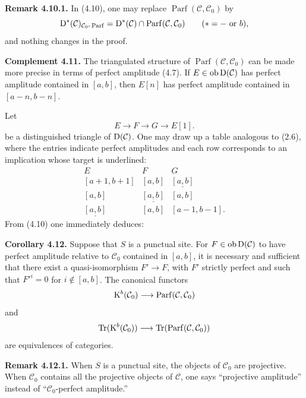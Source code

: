 \documentclass[11pt]{article}
\newcommand{\Parf}{\operatorname{Parf}}
\begin{document}
\textbf{Remark 4.10.1.} In (4.10), one may replace \(\Parf(\mathcal C,\mathcal C_0)\) by
\[
  \Dpx^*(\mathcal C)_{\mathcal C_0\text{-}\Parf}
  =\Dpx^*(\mathcal C)\cap\Parf(\mathcal C,\mathcal C_0)
  \qquad(*=-\text{ or }b),
\]
and nothing changes in the proof.

\textbf{Complement 4.11.} The triangulated structure of \(\Parf(\mathcal C,\mathcal C_0)\) can be made more precise in terms of perfect amplitude (4.7). If \(E\in\Ob\Dpx(\mathcal C)\) has perfect amplitude contained in \([a,b]\), then \(E[n]\) has perfect amplitude contained in \([a-n,b-n]\).

Let
\[
  E\longrightarrow F\longrightarrow G\longrightarrow E[1].
\]
be a distinguished triangle of \(\Dpx(\mathcal C)\). One may draw up a table analogous to (2.6), where the entries indicate perfect amplitudes and each row corresponds to an implication whose target is underlined:
\[
\begin{array}{ccc}
E&F&G\\[0.3em]
{}[a+1,b+1]&{}[a,b]&\underline{[a,b]}\\
{}[a,b]&\underline{[a,b]}&{}[a,b]\\
\underline{[a,b]}&{}[a,b]&{}[a-1,b-1].
\end{array}
\]
From (4.10) one immediately deduces:

\textbf{Corollary 4.12.} Suppose that \(S\) is a punctual site. For \(F\in\Ob\Dpx(\mathcal C)\) to have perfect amplitude relative to \(\mathcal C_0\) contained in \([a,b]\), it is necessary and sufficient that there exist a quasi-isomorphism \(F'\to F\), with \(F'\) strictly perfect and such that \(F'^i=0\) for \(i\notin[a,b]\). The canonical functors
\[
  \Kpx^b(\mathcal C_0)\longrightarrow\Parf(\mathcal C,\mathcal C_0)
\]
and
\[
  \Tr(\Kpx^b(\mathcal C_0))\longrightarrow\Tr(\Parf(\mathcal C,\mathcal C_0))
\]
are equivalences of categories.

\textbf{Remark 4.12.1.} When \(S\) is a punctual site, the objects of \(\mathcal C_0\) are projective. When \(\mathcal C_0\) contains all the projective objects of \(\mathcal C\), one says ``projective amplitude'' instead of ``\(\mathcal C_0\)-perfect amplitude.''



\providecommand{\Cpx}{\mathrm C}
\providecommand{\Kpx}{\mathrm K}
\providecommand{\Dpx}{\mathrm D}
\providecommand{\Ho}{\mathrm H}
\providecommand{\RHom}{\mathrm R\!\operatorname{Hom}}
\providecommand{\Ob}{\operatorname{ob}}
\providecommand{\qis}{\xrightarrow{\sim}}
\providecommand{\RHom}{\mathrm R\!\Hom}
\providecommand{\Ext}{\operatorname{Ext}}
\providecommand{\Hom}{\operatorname{Hom}}
\providecommand{\Tr}{\operatorname{Tr}}
\end{document}
